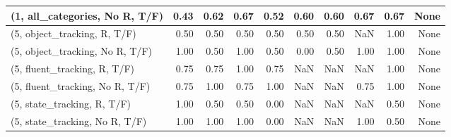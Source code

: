 \begin{table*}[h!]
\begin{adjustbox}{width=2\columnwidth,center}
\begin{tabular}{lrrr|rrr|rrr}
(1, all\_categories, No R, T/F)       &                      0.43 &                  0.62 &                      0.67 &                          0.52 &                      0.60 &                          0.60 &                                   0.67 &                               0.67 &                                  None \\



\midrule
(5, object\_tracking, R, T/F)         &                      0.50 &                  0.50 &                      0.50 &                          0.50 &                      0.50 &                          0.50 &                                    NaN &                               1.00 &                                  None \\
(5, object\_tracking, No R, T/F)      &                      1.00 &                  0.50 &                      1.00 &                          0.50 &                      0.00 &                          0.50 &                                   1.00 &                               1.00 &                                  None \\
(5, fluent\_tracking, R, T/F)         &                      0.75 &                  0.75 &                      1.00 &                          0.75 &                       NaN &                           NaN &                                    NaN &                               1.00 &                                  None \\
(5, fluent\_tracking, No R, T/F)      &                      0.75 &                  1.00 &                      0.75 &                          1.00 &                       NaN &                           NaN &                                   0.75 &                               1.00 &                                  None \\
(5, state\_tracking, R, T/F)          &                      1.00 &                  0.50 &                      0.50 &                          0.00 &                       NaN &                           NaN &                                    NaN &                               0.50 &                                  None \\
(5, state\_tracking, No R, T/F)       &                      1.00 &                  1.00 &                      1.00 &                          0.00 &                       NaN &                           NaN &                                   1.00 &                               0.50 &                                  None \\

\end{tabular}
\end{adjustbox}
\end{table*}
